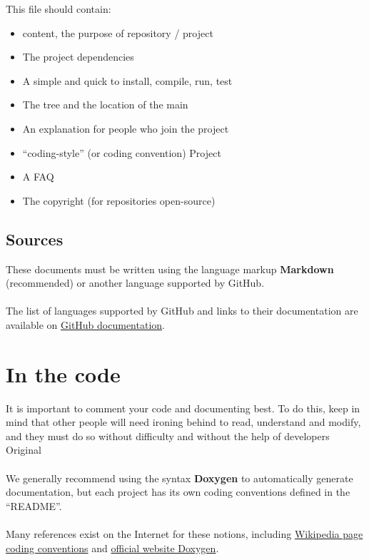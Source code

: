 \documentclass{life-fr}
\begin{document}
This file should contain:
\begin{itemize}
  \item content, the purpose of repository / project
  \item The project dependencies
  \item A simple and quick to install, compile, run, test
  \item The tree and the location of the main
  \item An explanation for people who join the project
  \item ``coding-style'' (or coding convention) Project
  \item A FAQ
  \item The copyright (for repositories open-source)
\end{itemize}

\subsection{Sources}

These documents must be written using the language
markup \textbf{Markdown} (recommended) or another
language supported by GitHub.\\
\\
The list of languages supported by GitHub and links to
their documentation are available on
\href{https://github.com/github/markup#markups}{GitHub documentation}.

\section{In the code}

It is important to comment your code and documenting best.
To do this, keep in mind that other people will need
ironing behind to read, understand and modify, and they
must do so without difficulty and without the help of developers
Original\\
\\
We generally recommend using the syntax \textbf{Doxygen}
to automatically generate documentation, but each project
has its own coding conventions defined in the ``README''.\\
\\
Many references exist on the Internet for these notions, including
\href{http://fr.wikipedia.org/wiki/R%C3%A8gles_de_codage}{Wikipedia page
coding conventions} and \href{http://www.doxygen.org/}{official website Doxygen}.

\end{document}
